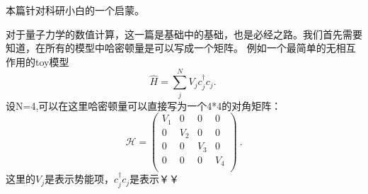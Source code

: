 
\begin{issues}
\issueDraft       %
\end{issues}
本篇针对科研小白的一个启蒙。

对于量子力学的数值计算，这一篇是基础中的基础，也是必经之路。我们首先需要知道，在所有的模型中哈密顿量是可以写成一个矩阵。
例如一个最简单的无相互作用的toy模型
\begin{equation}\label{ham1}
\hat{H}=  \sum_j^{N}V_j c_j^{\dagger}c_j.~
\end{equation}
设N=4,可以在这里哈密顿量可以直接写为一个4*4的对角矩阵：
\begin{equation}
\mathcal{H}=\left(
\begin{matrix}
V_1 & 0& 0&0\\
0 &V_2&0&0\\
0&0&V_3&0\\
0&0&0&V_4\\
\end{matrix}
\right)~.
\end{equation}
这里的$V_j$是表示势能项，$c_j^{\dagger}c_j$是表示￥￥